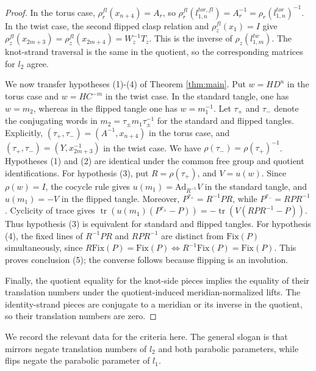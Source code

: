 \documentclass{article}
\DeclareMathOperator{\tr}{tr}
\theoremstyle{plain}
\theoremstyle{definition}
\theoremstyle{plain}
\theoremstyle{plain}
\theoremstyle{plain}
\theoremstyle{remark}
\theoremstyle{remark}
\theoremstyle{plain}
\theoremstyle{plain}
\newcounter{main}
\theoremstyle{plain}
\theoremstyle{plain}
\begin{document}
\begin{proof}
\medskip

In the torus case, $\rho_r^{fl}(x_{n+4}) = A_r$, so $\rho_r^{fl}(l_{1,n}^{tor,fl}) = A_r^{-1} = \rho_r(l_{1,n}^{tor})^{-1}$. In the twist case, the second flipped clasp relation and $\rho_z^{fl}(x_1) = I$ give $\rho_z^{fl}(x_{2m+3}) = \rho_z^{fl}(x_{2m+4}) = W_z^{-1}T_z$. This is the inverse of $\rho_z(l_{1,m}^{tw})$. The knot-strand traversal is the same in the quotient, so the corresponding matrices for $l_2$ agree.

\medskip

We now transfer hypotheses (1)-(4) of Theorem \ref{thm:main}. Put $w = HD^n$ in the torus case and $w = HC^{-m}$ in the twist case. In the standard tangle, one has $w = m_2$, whereas in the flipped tangle one has $w = m_1^{-1}$. Let $\tau_+$ and $\tau_-$ denote the conjugating words in $m_2 = \tau_\pm m_1\tau_\pm^{-1}$ for the standard and flipped tangles. Explicitly, $(\tau_+, \tau_-) = (A^{-1}, x_{n+4})$ in the torus case, and $(\tau_+, \tau_-) = (Y, x_{2m+3}^{-1})$ in the twist case. We have $\rho(\tau_-) = \rho(\tau_+)^{-1}$. Hypotheses (1) and (2) are identical under the common free group and quotient identifications. For hypothesis (3), put $R = \rho(\tau_+)$, and $V = u(w)$. Since $\rho(w) = I$, the cocycle rule gives $u(m_1) = \mathrm{Ad}_{R^{-1}}V$ in the standard tangle, and $u(m_1) = -V$ in the flipped tangle. Moreover, $P^{\tau_+} = R^{-1}PR$, while $P^{\tau_-} = RPR^{-1}$. Cyclicity of trace gives $\tr(u(m_1)(P^{\tau_\pm}-P)) = -\tr(V(RPR^{-1}-P))$. Thus hypothesis (3) is equivalent for standard and flipped tangles. For hypothesis (4), the fixed lines of $R^{-1}PR$ and $RPR^{-1}$ are distinct from $\mathrm{Fix}(P)$ simultaneously, since $R\mathrm{Fix}(P) = \mathrm{Fix}(P) \iff R^{-1}\mathrm{Fix}(P) = \mathrm{Fix}(P)$. This proves conclusion (5); the converse follows because flipping is an involution. 

\medskip

Finally, the quotient equality for the knot-side pieces implies the equality of their translation numbers under the quotient-induced meridian-normalized lifts. The identity-strand pieces are conjugate to a meridian or its inverse in the quotient, so their translation numbers are zero.
\end{proof}

We record the relevant data for the criteria here. The general slogan is that mirrors negate translation numbers of $l_2$ and both parabolic parameters, while flips negate the parabolic parameter of $l_1$. 
\end{document}
